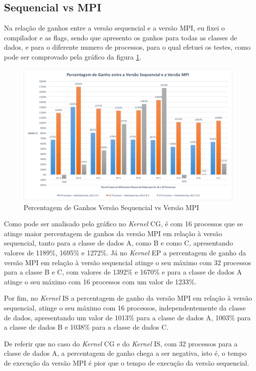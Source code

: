 \documentclass[conference,compsoc]{IEEEtran}
\begin{document}
\subsection{Sequencial vs MPI}
Na relação de ganhos entre a versão sequencial e a versão MPI, eu fixei o compilador e as flags, sendo que apresento os ganhos para todas as classes de dados, e para o diferente numero de processos, para o qual efetuei os testes, como pode ser comprovado pela gráfico da figura \ref{fig:ganhos_seq_vs_mpi}.

\begin{figure}[h!]
\centering
\includegraphics[scale=0.325]{ganhos_seq_vs_mpi.png}
\caption{Percentagem de Ganhos Versão Sequencial vs Versão MPI}
\label{fig:ganhos_seq_vs_mpi}
\end{figure}

Como pode ser analisado pelo gráfico no \textit{Kernel} CG, é com 16 processos que se atinge maior percentagem de ganhos da versão MPI em relação à versão sequencial, tanto para a classe de dados A, como B e como C, apresentando valores de 1189\%, 1695\% e 1272\%. Já no \textit{Kernel} EP a percentagem de ganho da versão MPI em relação à versão sequencial atinge o seu máximo com 32 processos para a classe B e C, com valores de 1392\% e 1670\% e para a classe de dados A atinge o seu máximo com 16 processos com um valor de 1233\%.

Por fim, no \textit{Kernel} IS a percentagem de ganho da versão MPI em relação à versão sequencial, atinge o seu máximo com 16 processos, independentemente da classe de dados, apresentando um valor de 1013\% para a classe de dados A, 1003\% para a classe de dados B e 1038\% para a classe de dados C.

De referir que no caso do \textit{Kernel} CG e do \textit{Kernel} IS, com 32 processos para a classe de dados A, a percentagem de ganho chega a ser negativa, isto é, o tempo de execução da versão MPI é pior que o tempo de execução da versão sequencial.
\end{document}
